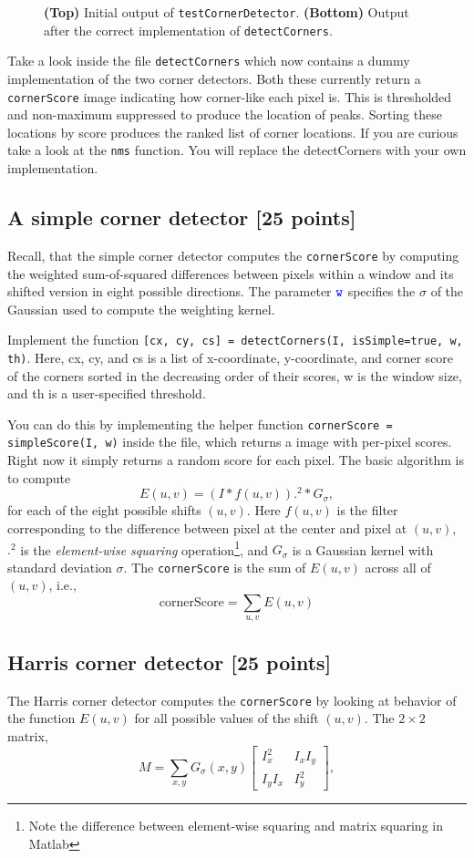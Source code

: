 \documentclass[10pt,letterpaper]{article}
\newcommand{\cmd}[1] {{\color{blue}\texttt{#1}}}
\begin{document}
\begin{figure}[h]
\caption{\label{fig:checker} \textbf{(Top)} Initial output of \cmd{testCornerDetector}. \textbf{(Bottom)} Output after the correct implementation of \cmd{detectCorners}.}
\end{figure}

Take a look inside the file \cmd{detectCorners} which now contains a
dummy implementation of the two corner detectors. Both these currently
return a
\cmd{cornerScore} image indicating how corner-like each pixel is.
This is thresholded and non-maximum suppressed to produce the
location of peaks. 
Sorting these locations by score produces the
ranked list of corner locations. If you are curious take a look at the
\cmd{nms} function.
You will replace the detectCorners with your own implementation.


\subsection{A simple corner detector [25 points]}
Recall, that the simple corner detector computes the \cmd{cornerScore} by computing the weighted sum-of-squared differences between pixels within a window and its shifted version in eight possible directions. The parameter $\cmd{w}$ specifies the $\sigma$ of the Gaussian used to compute the weighting kernel.


Implement the function \cmd{[cx, cy, cs] = detectCorners(I, isSimple=true, w, th)}. Here, cx, cy, and cs is a list of x-coordinate, y-coordinate, and corner score of the corners sorted in the decreasing order of their scores, w is the window size, and th is a user-specified threshold.

You can do this by implementing the helper function \cmd{cornerScore = simpleScore(I, w)} inside the file, which returns a image with per-pixel scores. Right now it simply returns a random score for each pixel. The basic algorithm is to compute
\[
	E(u,v) = \left( I * f(u,v) \right).^2 * G_\sigma,
\]
for each of the eight possible shifts $(u,v)$. Here $f(u,v)$ is the filter corresponding to the difference between pixel at the center and pixel at $(u,v)$, $.^2$ is the \emph{element-wise squaring} operation\footnote{Note the difference between element-wise squaring and matrix squaring in Matlab}, and $G_\sigma$ is a Gaussian kernel with standard deviation $\sigma$. The \cmd{cornerScore} is the sum of $E(u,v)$ across all of $(u,v)$, i.e., 
\[
\text{cornerScore} = \sum_{u,v} E(u,v)
\]

\subsection{Harris corner detector [25 points]}
The Harris corner detector computes the \cmd{cornerScore} by looking at behavior of the function $E(u,v)$ for all possible values of the shift $(u,v)$. The $2\times2$ matrix, 
\[
	M = \sum_{x,y} G_\sigma(x,y) \left[ 
	\begin{array}{cc}
				I_x^2 &  I_xI_y \\
				I_yI_x &  I_y^2 \end{array} 
				\right], 
\]
\end{document}
